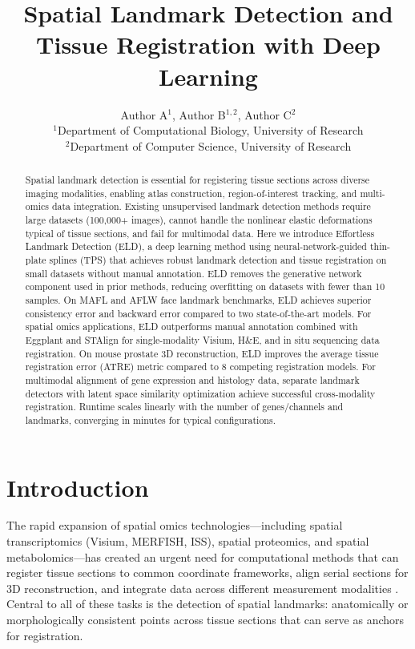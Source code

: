 \documentclass[11pt]{article}
\title{Spatial Landmark Detection and Tissue Registration with Deep Learning}
\author{Author A$^{1}$, Author B$^{1,2}$, Author C$^{2}$ \\
\small $^{1}$Department of Computational Biology, University of Research \\
\small $^{2}$Department of Computer Science, University of Research}
\date{}
\begin{document}
\maketitle

\begin{abstract}
Spatial landmark detection is essential for registering tissue sections across diverse imaging modalities, enabling atlas construction, region-of-interest tracking, and multi-omics data integration. Existing unsupervised landmark detection methods require large datasets (100,000+ images), cannot handle the nonlinear elastic deformations typical of tissue sections, and fail for multimodal data. Here we introduce Effortless Landmark Detection (ELD), a deep learning method using neural-network-guided thin-plate splines (TPS) that achieves robust landmark detection and tissue registration on small datasets without manual annotation. ELD removes the generative network component used in prior methods, reducing overfitting on datasets with fewer than 10 samples. On MAFL and AFLW face landmark benchmarks, ELD achieves superior consistency error and backward error compared to two state-of-the-art models. For spatial omics applications, ELD outperforms manual annotation combined with Eggplant and STAlign for single-modality Visium, H\&E, and in situ sequencing data registration. On mouse prostate 3D reconstruction, ELD improves the average tissue registration error (ATRE) metric compared to 8 competing registration models. For multimodal alignment of gene expression and histology data, separate landmark detectors with latent space similarity optimization achieve successful cross-modality registration. Runtime scales linearly with the number of genes/channels and landmarks, converging in minutes for typical configurations.
\end{abstract}

\section{Introduction}

The rapid expansion of spatial omics technologies---including spatial transcriptomics (Visium, MERFISH, ISS), spatial proteomics, and spatial metabolomics---has created an urgent need for computational methods that can register tissue sections to common coordinate frameworks, align serial sections for 3D reconstruction, and integrate data across different measurement modalities \citep{moses2022,rao2021}. Central to all of these tasks is the detection of spatial landmarks: anatomically or morphologically consistent points across tissue sections that can serve as anchors for registration.
\end{document}

